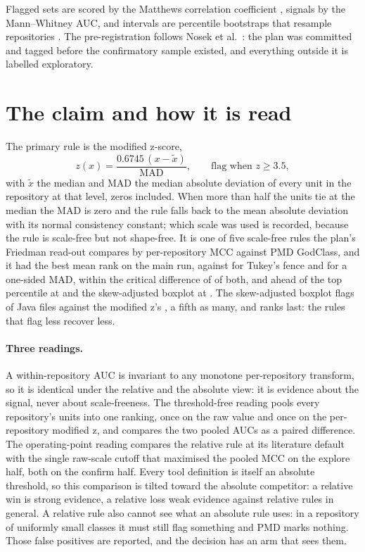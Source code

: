 \documentclass[11pt,a4paper]{article}
\begin{document}
Flagged sets are scored by the Matthews correlation coefficient
\cite{chicco2020}, signals by the Mann--Whitney AUC, and intervals are
percentile bootstraps that resample repositories \cite{davison1997}. The
pre-registration follows Nosek et al.\ \cite{nosek2018}: the plan was
committed and tagged before the confirmatory sample existed, and everything
outside it is labelled exploratory.

\section{The claim and how it is read}
\label{sec:claim}

The primary rule is the modified z-score,
\begin{equation}
z(x) = \frac{0.6745\,(x - \tilde{x})}{\mathrm{MAD}}, \qquad \text{flag when } z \geq 3.5,
\end{equation}
with $\tilde{x}$ the median and MAD the median absolute deviation of every
unit in the repository at that level, zeros included. When more than half the
units tie at the median the MAD is zero and the rule falls back to the mean
absolute deviation with its normal consistency constant; which scale was used
is recorded, because the rule is scale-free but not shape-free. It is one of
five scale-free rules the plan's Friedman read-out compares by
per-repository MCC against PMD GodClass, and it had the best mean rank on the
main run, \friedRankMadZ{} against \friedRankIqr{} for Tukey's fence and
\friedRankDoubleMad{} for a one-sided MAD, within the critical difference of
\friedRulesCD{} of both, and ahead of the top percentile at
\friedRankPctTopOne{} and the skew-adjusted boxplot at
\friedRankAdjBoxplot{}. The skew-adjusted boxplot flags
\primFlagRateAdjBoxplot{} of Java files against the modified z's
\primFlagRateMadz{}, a fifth as many, and ranks last: the rules that flag
less recover less.

\paragraph{Three readings.} A within-repository AUC is invariant to any
monotone per-repository transform, so it is identical under the relative and
the absolute view: it is evidence about the signal, never about
scale-freeness. The threshold-free reading pools every repository's units into
one ranking, once on the raw value and once on the per-repository modified z,
and compares the two pooled AUCs as a paired difference. The operating-point
reading compares the relative rule at its literature default with the single
raw-scale cutoff that maximised the pooled MCC on the explore half, both on the
confirm half. Every tool definition is itself an absolute threshold, so this
comparison is tilted toward the absolute competitor: a relative win is strong
evidence, a relative loss weak evidence against relative rules in general. A
relative rule also cannot see what an absolute rule uses: in a repository of
uniformly small classes it must still flag something and PMD marks nothing.
Those false positives are reported, and the decision has an arm that sees
them.
\end{document}

